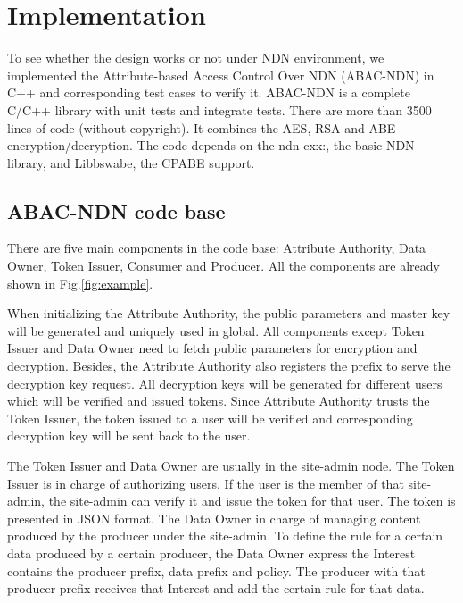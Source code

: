 \section{Implementation}

To see whether the design works or not under NDN environment, we implemented the Attribute-based Access Control Over NDN (ABAC-NDN) in C++ and corresponding test cases to verify it. ABAC-NDN is a complete C/C++ library with unit tests and integrate tests. There are more than 3500 lines of code (without copyright). It combines the AES, RSA and ABE encryption/decryption. The code depends on the ndn-cxx:, the basic NDN library, and Libbswabe, the CPABE support.

\subsection{ABAC-NDN code base}

There are five main components in the code base: Attribute Authority, Data Owner, Token Issuer, Consumer and Producer. All the components are already shown in Fig.\ref{fig:example}.

When initializing the Attribute Authority, the public parameters and master key will be generated and uniquely used in global. All components except Token Issuer and Data Owner need to fetch public parameters for encryption and decryption. Besides, the Attribute Authority also registers the prefix to serve the decryption key request. All decryption keys will be generated for different users which will be verified and issued tokens. Since Attribute Authority trusts the Token Issuer, the token issued to a user will be verified and corresponding decryption key will be sent back to the user.

The Token Issuer and Data Owner are usually in the site-admin node. The Token Issuer is in charge of authorizing users. If the user is the member of that site-admin, the site-admin can verify it and issue the token for that user. The token is presented in JSON format. The Data Owner in charge of managing content produced by the producer under the site-admin. To define the rule for a certain data produced by a certain producer, the Data Owner express the Interest contains the producer prefix, data prefix and policy. The producer with that producer prefix receives that Interest and add the certain rule for that data.

